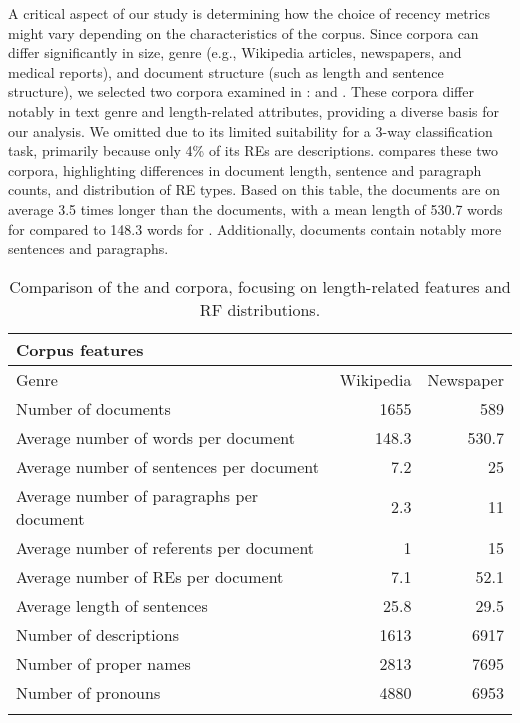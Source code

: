 A critical aspect of our study is determining how the choice of recency metrics might vary depending on the characteristics of the corpus. Since corpora can differ significantly in size, genre (e.g., Wikipedia articles, newspapers, and medical reports), and document structure (such as length and sentence structure), we selected two corpora examined in : \wsj and \msrcor. These corpora differ notably in text genre and length-related attributes, providing a diverse basis for our analysis. We omitted \negcor due to its limited suitability for a 3-way classification task, primarily because only 4\% of its REs are descriptions.  compares these two corpora, highlighting differences in document length, sentence and paragraph counts, and distribution of RE types. Based on this table, the \wsj documents are on average 3.5 times longer than the \msrcor documents, with a mean length of 530.7 words for \wsj compared to 148.3 words for \msrcor. Additionally, \wsj documents contain notably more sentences and paragraphs.

\begin{table}
	\begin{tabularx}{\textwidth}{Xrr}
		\lsptoprule
		Corpus features & \msrcor & \wsj \\ \midrule
		Genre & Wikipedia & Newspaper\\
		Number of documents & 1655   & 589   \\ 
		Average number of words per document & 148.3  & 530.7   \\ 
		Average number of sentences per document & 7.2  & 25   \\ 
		Average number of paragraphs per document & 2.3  & 11   \\ 
		Average number of referents per document & 1   & 15   \\ 
		Average number of REs per document & 7.1   & 52.1   \\ 
		Average length of sentences & 25.8   & 29.5   \\ 
		Number of descriptions & 1613   & 6917   \\ 
		Number of proper names & 2813   & 7695   \\ 
		Number of pronouns & 4880   & 6953   \\ 
		\lspbottomrule
	\end{tabularx}
	\caption[Comparison of the \msrcor and \wsj corpora.]{\label{tab:corpora}
		Comparison of the \msrcor and \wsj corpora, focusing on length-related features and RF distributions.}
\end{table}


